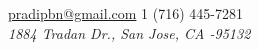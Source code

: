 \documentclass[10pt,a4paper]{article} %
\begin{document}
 


 {} %

\noindent\href{mailto:pradipbn@gmail.com}{pradipbn@gmail.com}\bull %
\textsmaller{+}1 (716) 445-7281\\%
\textit{1884 Tradan Dr., San Jose, CA -95132}

\spacedhrule{0.9em}{-0.4em} %




\end{document}

